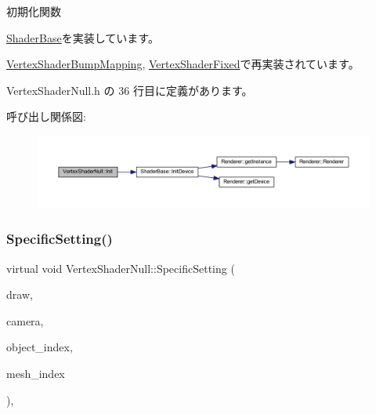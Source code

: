 初期化関数 



\mbox{\hyperlink{class_shader_base_a9622b2f5e0184a78d3af82820dc5113d}{Shader\+Base}}を実装しています。



\mbox{\hyperlink{class_vertex_shader_bump_mapping_a6c0f59d1f29fd883943a66bfe61b6b03}{Vertex\+Shader\+Bump\+Mapping}}, \mbox{\hyperlink{class_vertex_shader_fixed_ae829ff736b33c45543804059255125b6}{Vertex\+Shader\+Fixed}}で再実装されています。



 Vertex\+Shader\+Null.\+h の 36 行目に定義があります。

呼び出し関係図\+:
\nopagebreak
\begin{figure}[H]
\begin{center}
\leavevmode
\includegraphics[width=350pt]{class_vertex_shader_null_af30eb8057fe0537bc6ade214647b6fb5_cgraph}
\end{center}
\end{figure}
\mbox{\label{class_vertex_shader_null_aa2234c6ea083e3c0233d59f222145992}} 
\subsubsection{\texorpdfstring{Specific\+Setting()}{SpecificSetting()}}
{\footnotesize\ttfamily virtual void Vertex\+Shader\+Null\+::\+Specific\+Setting (\begin{DoxyParamCaption}\item[{\mbox{\hyperlink{class_draw_base}{Draw\+Base}} $\ast$}]{draw,  }\item[{\mbox{\hyperlink{class_camera}{Camera}} $\ast$}]{camera,  }\item[{unsigned}]{object\+\_\+index,  }\item[{unsigned}]{mesh\+\_\+index }\end{DoxyParamCaption})\hspace{0.3cm}{\ttfamily [inline]}, {\ttfamily [virtual]}}




